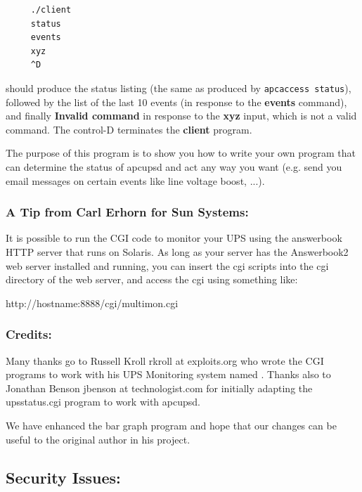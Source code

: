 {{{{{{{\footnotesize
\begin{verbatim}
     ./client
     status
     events
     xyz
     ^D
\end{verbatim}
\normalsize

should produce the status listing (the same as produced by {\tt apcaccess
status}), followed by the list of the last 10 events (in response to the {\bf
events} command), and finally {\bf Invalid command} in response to the {\bf
xyz} input, which is not a valid command. The control-D terminates the {\bf
client} program.  

The purpose of this program is to show you how to write your own program that
can determine the status of apcupsd and act any way you want (e.g. send you
email messages on certain events like line voltage boost, ...). 

\label{A-Tip-from-Carl-Erhorn-for-Sun-Systems}

\subsubsection*{A Tip from Carl Erhorn for Sun Systems:}

\label{index-Tip-137}
It is possible to run the CGI code to monitor your UPS using the answerbook
HTTP server that runs on Solaris. As long as your server has the Answerbook2
web server installed and running, you can insert the cgi scripts into the cgi
directory of the web server, and access the cgi using something like:  

http://hostname:8888/cgi/multimon.cgi 

\label{Credits}

\subsubsection*{Credits:}

Many thanks go to Russell Kroll \lt{}rkroll at exploits.org\gt{} who wrote the
CGI programs to work with his UPS Monitoring system named 
. Thanks also to
Jonathan Benson \lt{}jbenson at technologist.com\gt{} for initially adapting
the upsstatus.cgi program to work with apcupsd.  

We have enhanced the bar graph program and hope that our changes can be useful
to the original author in his project. 

\label{Security-Issues}

\subsection*{Security Issues:}

}}}}}}}
